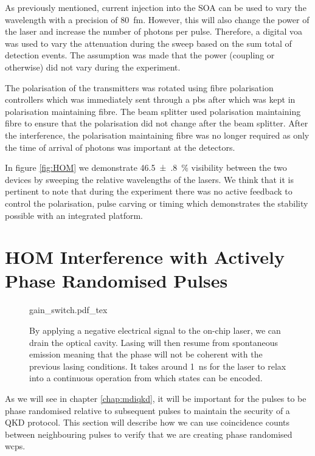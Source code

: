 As previously mentioned, current injection into the \ac{SOA} can be used to vary the wavelength with a precision of \SI{80}{\femto\metre}. However, this will also change the power of the laser and increase the number of photons per pulse. Therefore, a digital \ac{voa} was used to vary the attenuation during the sweep based on the sum total of detection events. The assumption was made that the power (coupling or otherwise) did not vary during the experiment. 

The polarisation of the transmitters was rotated using fibre polarisation controllers which was immediately sent through a \ac{pbs} after which was kept in polarisation maintaining fibre. The beam splitter used polarisation maintaining fibre to ensure that the polarisation did not change after the beam splitter. After the interference, the polarisation maintaining fibre was no longer required as only the time of arrival of photons was important at the detectors.

In figure \ref{fig:HOM} we demonstrate \SI{46.5(8)}{\percent} visibility between the two devices by sweeping the relative wavelengths of the lasers. We think that it is pertinent to note that during the experiment there was no active feedback to control the polarisation, pulse carving or timing which demonstrates the stability possible with an integrated platform. 

\section{HOM Interference with Actively Phase Randomised Pulses}

\begin{figure}[tbp]
	\centering
	\def\svgwidth{0.9\textwidth} 
	{gain_switch.pdf_tex}
	\caption[Gain switching of the on-chip lasers at \SI{250}{MHz}]{By applying a negative electrical signal to the on-chip laser, we can drain the optical cavity. Lasing will then resume from spontaneous emission meaning that the phase will not be coherent with the previous lasing conditions. It takes around \SI{1}{\ns} for the laser to relax into a continuous operation from which states can be encoded.}
	\label{fig:gain_switch}
\end{figure}

As we will see in chapter \ref{chap:mdiqkd}, it will be important for the pulses to be phase randomised relative to subsequent pulses to maintain the security of a \ac{QKD} protocol. This section will describe how we can use coincidence counts between neighbouring pulses to verify that we are creating phase randomised \acp{wcp}.

